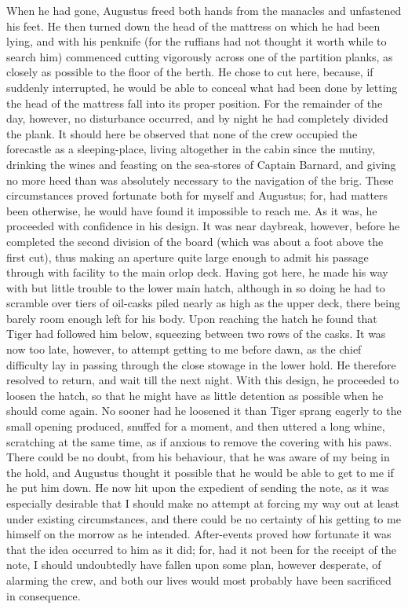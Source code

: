 When he had gone, Augustus freed both hands from the manacles and unfastened
his feet. He then turned down the head of the mattress on which he had been
lying, and with his penknife (for the ruffians had not thought it worth while to
search him) commenced cutting vigorously across one of the partition planks, as
closely as possible to the floor of the berth. He chose to cut here, because, if
suddenly interrupted, he would be able to conceal what had been done by letting
the head of the mattress fall into its proper position. For the remainder of the
day, however, no disturbance occurred, and by night he had completely divided
the plank. It should here be observed that none of the crew occupied the
forecastle as a sleeping-place, living altogether in the cabin since the mutiny,
drinking the wines and feasting on the sea-stores of Captain Barnard, and giving
no more heed than was absolutely necessary to the navigation of the brig. These
circumstances proved fortunate both for myself and Augustus; for, had matters
been otherwise, he would have found it impossible to reach me. As it was, he
proceeded with confidence in his design. It was near daybreak, however, before
he completed the second division of the board (which was about a foot above the
first cut), thus making an aperture quite large enough to admit his passage
through with facility to the main orlop deck. Having got here, he made his way
with but little trouble to the lower main hatch, although in so doing he had to
scramble over tiers of oil-casks piled nearly as high as the upper deck, there
being barely room enough left for his body. Upon reaching the hatch he found
that Tiger had followed him below, squeezing between two rows of the casks. It
was now too late, however, to attempt getting to me before dawn, as the chief
difficulty lay in passing through the close stowage in the lower hold. He
therefore resolved to return, and wait till the next night. With this design, he
proceeded to loosen the hatch, so that he might have as little detention as
possible when he should come again. No sooner had he loosened it than Tiger
sprang eagerly to the small opening produced, snuffed for a moment, and then
uttered a long whine, scratching at the same time, as if anxious to remove the
covering with his paws. There could be no doubt, from his behaviour, that he was
aware of my being in the hold, and Augustus thought it possible that he would be
able to get to me if he put him down. He now hit upon the expedient of sending
the note, as it was especially desirable that I should make no attempt at
forcing my way out at least under existing circumstances, and there could be no
certainty of his getting to me himself on the morrow as he intended.
After-events proved how fortunate it was that the idea occurred to him as it
did; for, had it not been for the receipt of the note, I should undoubtedly have
fallen upon some plan, however desperate, of alarming the crew, and both our
lives would most probably have been sacrificed in consequence. 

